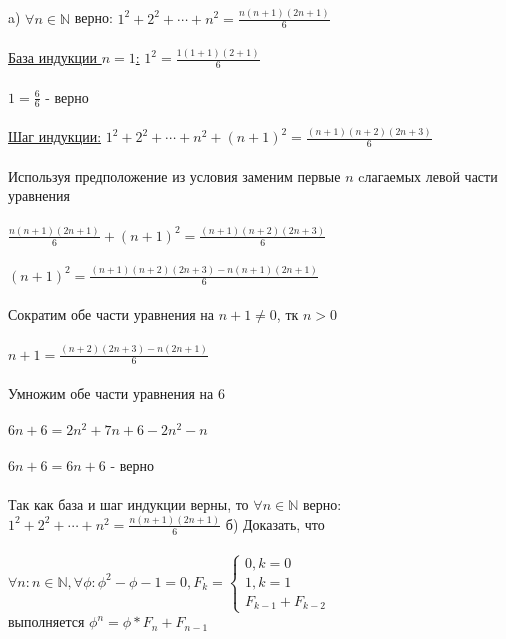 \documentclass[12pt, a4paper]{article}
\begin{document}
	 \bspace
	\\\\
	a) $\forall n \in \mathbb{N}$ верно: $1^ 2  + 2 ^ 2 + \cdots + n ^ 2 = \frac{n(n + 1)(2n + 1)}{6}$ \\
	\\
	\underline{База индукции $n = 1$:} $1 ^ 2 = \frac{1(1 + 1)(2 + 1)}{6}$\\
	\\ 
	$1  = \frac{6}{6}$ - верно\\
	\\
	\underline{Шаг индукции:} $1 ^ 2  + 2 ^ 2 + \cdots + n ^ 2 + (n + 1) ^ 2 = \frac{(n + 1)(n + 2)(2n + 3)}{6}$\\
	\\
	Используя предположение из условия заменим первые $n$ cлагаемых левой части уравнения \\
	\\
	$\frac{n(n + 1)(2n + 1)}{6} + (n  + 1) ^ 2 = \frac{(n + 1)(n + 2)(2n + 3)}{6}$\\
	\\
	$(n  + 1) ^ 2 =  \frac{(n + 1)(n + 2)(2n + 3) - n(n + 1)(2n + 1)}{6}$\\
	\\
	Сократим обе части уравнения на $n + 1 \neq 0$, тк $n > 0$\\
	\\
	$n + 1 =  \frac{(n + 2)(2n + 3) - n(2n  + 1)}{6}$\\
	\\
	Умножим обе части уравнения на 6\\
	\\
	$6n + 6 = 2n^2 + 7n + 6 - 2n^2 - n$\\
	\\
	$6n + 6 = 6n + 6$ - верно\\
	\\
	Так как база и шаг индукции верны, то $\forall n \in \mathbb{N}$ верно: $1^ 2  + 2 ^ 2 + \cdots + n ^ 2 = \frac{n(n + 1)(2n + 1)}{6}$\bspace
	б) Доказать, что \\\\ $\forall n: n \in \mathbb{N},  \forall \phi: \phi ^ 2 - \phi - 1 = 0,  F_k = \left \{ \begin{array}{l} 0, k = 0 \\ 1, k = 1 \\ F_{k - 1} + F_{k - 2} \end{array} \right .$ \\ выполняется $\phi ^ n = \phi * F_n + F_{n - 1}$\\
\end{document}
